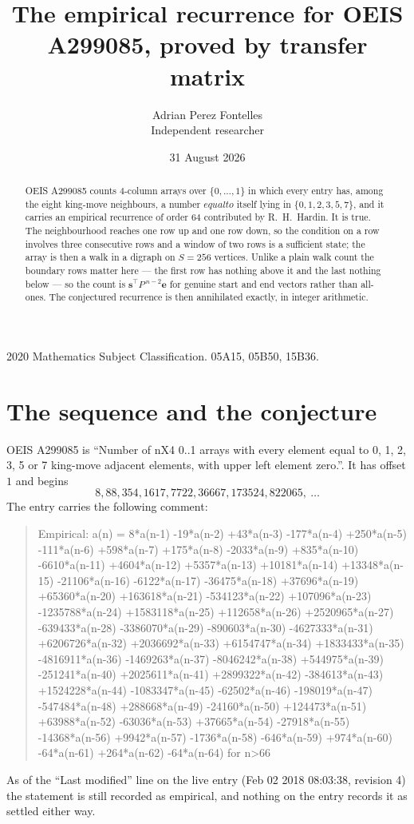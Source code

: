 \documentclass[11pt,a4paper]{article}
\title{The empirical recurrence for OEIS A299085, proved by transfer matrix}
\author{Adrian Perez Fontelles\\ \small Independent researcher}
\date{31 August 2026}
\theoremstyle{plain}
\theoremstyle{definition}
\begin{document}
\maketitle

\begin{abstract}
OEIS A299085 counts $4$-column arrays over $\{0,\dots,1\}$ in which every entry has,
among the eight king-move neighbours, a number $equal to$ itself lying in $\{0,1,2,3,5,7\}$, and it carries an empirical
recurrence of order $64$ contributed by R.~H.~Hardin. It is true. The neighbourhood
reaches one row up and one row down, so the condition on a row involves three consecutive
rows and a window of two rows is a sufficient state; the array is then a walk in a digraph
on $S=256$ vertices. Unlike a plain walk count the boundary rows matter here --- the first
row has nothing above it and the last nothing below --- so the count is
$\mathbf{s}^{\!\top}P^{\,n-2}\mathbf{e}$ for genuine start and end vectors rather than
all-ones. The conjectured recurrence is then annihilated exactly, in integer arithmetic.
\end{abstract}

\noindent\small 2020 Mathematics Subject Classification. 05A15, 05B50, 15B36.\normalsize

\section{The sequence and the conjecture}

OEIS A299085 is ``Number of nX4 0..1 arrays with every element equal to 0, 1, 2, 3, 5 or 7 king-move adjacent elements, with upper left element zero.''. It has offset
$1$ and begins
\[
8, 88, 354, 1617, 7722, 36667, 173524, 822065,\ \dots
\]
The entry carries the following comment:
\begin{quote}\small
Empirical: a(n) = 8*a(n-1) -19*a(n-2) +43*a(n-3) -177*a(n-4) +250*a(n-5) -111*a(n-6) +598*a(n-7) +175*a(n-8) -2033*a(n-9) +835*a(n-10) -6610*a(n-11) +4604*a(n-12) +5357*a(n-13) +10181*a(n-14) +13348*a(n-15) -21106*a(n-16) -6122*a(n-17) -36475*a(n-18) +37696*a(n-19) +65360*a(n-20) +163618*a(n-21) -534123*a(n-22) +107096*a(n-23) -1235788*a(n-24) +1583118*a(n-25) +112658*a(n-26) +2520965*a(n-27) -639433*a(n-28) -3386070*a(n-29) -890603*a(n-30) -4627333*a(n-31) +6206726*a(n-32) +2036692*a(n-33) +6154747*a(n-34) +1833433*a(n-35) -4816911*a(n-36) -1469263*a(n-37) -8046242*a(n-38) +544975*a(n-39) -251241*a(n-40) +2025611*a(n-41) +2899322*a(n-42) -384613*a(n-43) +1524228*a(n-44) -1083347*a(n-45) -62502*a(n-46) -198019*a(n-47) -547484*a(n-48) +288668*a(n-49) -24160*a(n-50) +124473*a(n-51) +63988*a(n-52) -63036*a(n-53) +37665*a(n-54) -27918*a(n-55) -14368*a(n-56) +9942*a(n-57) -1736*a(n-58) -646*a(n-59) +974*a(n-60) -64*a(n-61) +264*a(n-62) -64*a(n-64) for n>66
\end{quote}
As of the ``Last modified'' line on the live entry (Feb 02 2018 08:03:38, revision
4) the statement is still recorded as empirical, and nothing on the entry
records it as settled either way.
\end{document}
